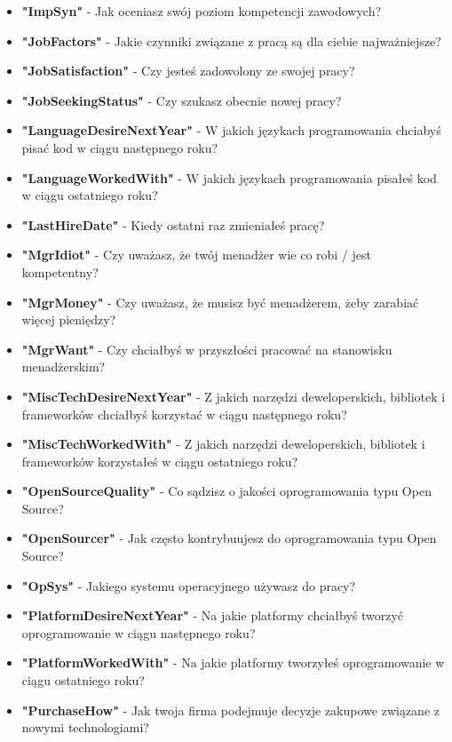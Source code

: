 \begin{appendices}
\begin{itemize}
        \item \textbf{"ImpSyn"} - Jak oceniasz swój poziom kompetencji zawodowych?
        \item \textbf{"JobFactors"} - Jakie czynniki związane z pracą są dla ciebie najważniejsze?
        \item \textbf{"JobSatisfaction"} - Czy jesteś zadowolony ze swojej pracy?
        \item \textbf{"JobSeekingStatus"} - Czy szukasz obecnie nowej pracy?
        \item \textbf{"LanguageDesireNextYear"} - W jakich językach programowania chciabyś pisać kod w ciągu następnego roku?
        \item \textbf{"LanguageWorkedWith"} - W jakich językach programowania pisałeś kod w ciągu ostatniego roku?
        \item \textbf{"LastHireDate"} - Kiedy ostatni raz zmieniałeś pracę?
        \item \textbf{"MgrIdiot"} - Czy uważasz, że twój menadżer wie co robi / jest kompetentny?
        \item \textbf{"MgrMoney"} - Czy uważasz, że musisz być menadżerem, żeby zarabiać więcej pieniędzy?
        \item \textbf{"MgrWant"} - Czy chciałbyś w przyszłości pracować na stanowisku menadżerskim?
        \item \textbf{"MiscTechDesireNextYear"} - Z jakich narzędzi deweloperskich, bibliotek i frameworków chciałbyś korzystać w ciągu następnego roku?
        \item \textbf{"MiscTechWorkedWith"} - Z jakich narzędzi deweloperskich, bibliotek i frameworków korzystałeś w ciągu ostatniego roku?
        \item \textbf{"OpenSourceQuality"} - Co sądzisz o jakości oprogramowania typu Open Source?
        \item \textbf{"OpenSourcer"} - Jak często kontrybuujesz do oprogramowania typu Open Source?
        \item \textbf{"OpSys"} - Jakiego systemu operacyjnego używasz do pracy?
        \item \textbf{"PlatformDesireNextYear"} - Na jakie platformy chciałbyś tworzyć oprogramowanie w ciągu następnego roku?
        \item \textbf{"PlatformWorkedWith"} - Na jakie platformy tworzyłeś oprogramowanie w ciągu ostatniego roku?
        \item \textbf{"PurchaseHow"} - Jak twoja firma podejmuje decyzje zakupowe związane z nowymi technologiami?

\end{itemize}
\end{appendices}
